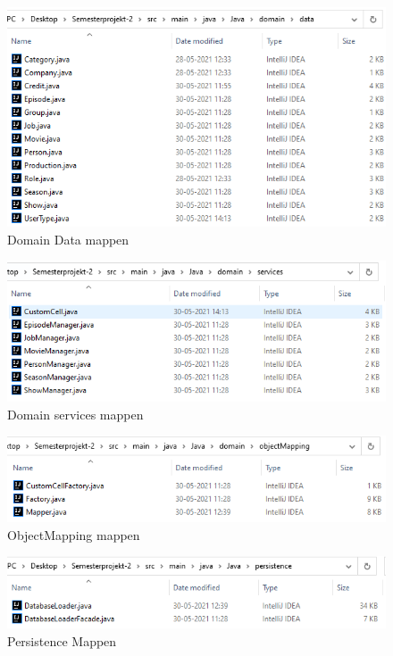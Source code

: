 \begin{figure}[H]
    \centering
    \includegraphics{images/domainData.PNG}
    \caption{Domain Data mappen}
    \label{fig:my_label}
\end{figure}

\begin{figure}
    \centering
    \includegraphics{images/services.PNG}
    \caption{Domain services mappen}
    \label{fig:my_label}
\end{figure}

\begin{figure}[H]
    \centering
    \includegraphics{images/ObjectMapping.PNG}
    \caption{ObjectMapping mappen}
    \label{fig:my_label}
\end{figure}

\begin{figure}[H]
    \centering
    \includegraphics{images/persistence.PNG}
    \caption{Persistence Mappen}
    \label{fig:my_label}
\end{figure}


